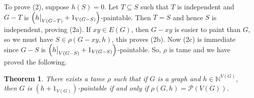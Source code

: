 \documentclass[12pt]{article}
\theoremstyle{plain}
\newtheorem{thm}{Theorem}[section]
\theoremstyle{definition}
\theoremstyle{remark}
\newcommand{\IN}{\mathbb{N}}
\newcommand{\parens}[1]{\left( #1 \right)}
\newcommand\restr[2]{{%
  \left.\kern-\nulldelimiterspace %
  #1 %
  \vphantom{\big|} %
  \right|_{#2} %
  }}
\newcommand{\powset}[1]{\mathcal{P}\parens{#1}}
\begin{document}
To prove (2), suppose $h(S) = 0$.  Let $T \subseteq S$ such that $T$ is independent and $G-T$ is $\parens{\restr{h}{V(G-T)} + 1_{V(G-S)}}$-paintable.  Then $T=S$ and hence $S$ is independent, proving (2a).  If $xy \in E(G)$, then $G-xy$ is easier to paint than $G$, so we must have $S \in \rho(G-xy, h)$, this proves (2b).  Now (2c) is immediate since $G-S$ is $\parens{\restr{h}{V(G-S)} + 1_{V(G-S)}}$-paintable.  So, $\rho$ is tame and we have proved the following.

\begin{thm}
	There exists a tame $\rho$ such that if $G$ is a graph and $h \in \IN^{V(G)}$, then $G$ is $(h + 1_{V(G)})$-paintable if and only if $\rho(G, h) = \powset{V(G)}$.
\end{thm}



\end{document}
